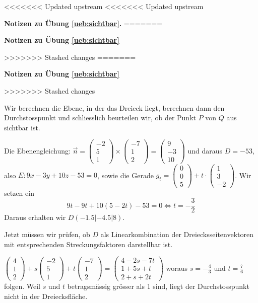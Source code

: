 \documentclass[%
11pt,%
twoside,%
titlepage,%
<<<<<<< Updated upstream
<<<<<<< Updated upstream
german,%
=======
swissgerman,%
>>>>>>> Stashed changes
=======
swissgerman,%
>>>>>>> Stashed changes
headsepline%
]{scrartcl}
\newcommand{\faReturnGray}{\textcolor{gray}{\faMailReply}} %
\newcommand{\faReturnGray}{\textcolor{gray}{\faMailReply}} %
\theoremstyle{definition}
\theoremstyle{plain}
\newcommand{\concatueb}[1]{ueb:#1}%
\newcommand{\concatlsg}[1]{lsg:#1}%
\newenvironment{lsg}[1]{%
<<<<<<< Updated upstream
<<<<<<< Updated upstream
    \par\noindent\textbf{Notizen zu Übung \ref{\concatueb{#1}}.}%
    \label{\concatlsg{#1}}
=======
    \par\noindent\textbf{Notizen zu Übung \ref{\concatueb{#1}}}\label{\concatlsg{#1}}
    \hfill\hyperref[\concatueb{#1}]{\faReturnGray}\par %
>>>>>>> Stashed changes
=======
    \par\noindent\textbf{Notizen zu Übung \ref{\concatueb{#1}}}\label{\concatlsg{#1}}
    \hfill\hyperref[\concatueb{#1}]{\faReturnGray}\par %
>>>>>>> Stashed changes
}{%
    \par%
}
\begin{document}
\begin{lsg}{sichtbar}
Wir berechnen die Ebene, in der das Dreieck liegt, berechnen dann den Durchstosspunkt und schliesslich beurteilen wir, ob der Punkt $P$ von $Q$ aus sichtbar ist.

Die Ebenengleichung: $\vec{n}=\begin{pmatrix}
    -2\\5\\1
\end{pmatrix}\times\begin{pmatrix}
    -7\\1\\2
\end{pmatrix}=\begin{pmatrix}
    9\\-3\\10
\end{pmatrix}$ und daraus $D=-53$, also $E: 9x-3y+10z-53=0$, sowie die Gerade $g_t=\begin{pmatrix}
    0\\0\\5
\end{pmatrix}+t\cdot\begin{pmatrix}
    1\\3\\-2
\end{pmatrix}$. Wir setzen ein
$$9t-9t+10(5-2t)-53=0\Leftrightarrow t=-\frac{3}{2}$$
Daraus erhalten wir $D(-1.5|-4.5|8)$.

Jetzt müssen wir prüfen, ob $D$ als Linearkombination der Dreiecksseitenvektoren mit entsprechenden Streckungsfaktoren darstellbar ist.

$\begin{pmatrix}
    4\\1\\2
\end{pmatrix}+s\begin{pmatrix}
    -2\\5\\1
\end{pmatrix}+t\begin{pmatrix}
    -7\\1\\2
\end{pmatrix}=\begin{pmatrix}
    4-2s-7t\\1+5s+t\\2+s+2t
\end{pmatrix}$
woraus $s=-\frac{4}{3}$ und $t=\frac{7}{6}$ folgen. Weil $s$ und $t$ betragsmässig grösser als $1$ sind, liegt der Durchstosspunkt nicht in der Dreiecksfläche.
\end{lsg}
\end{document}
